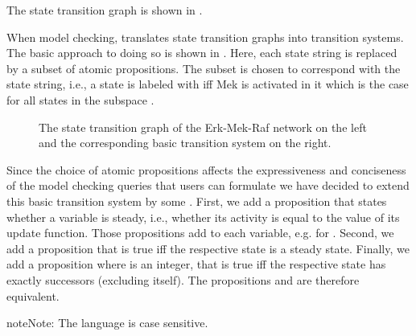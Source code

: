 \documentclass[letterpaper,10pt,english]{sphinxmanual}
\begin{document}
The state transition graph is shown in {\hyperref[\detokenize{Manual:figure17}]{}}.

When model checking,  translates state transition graphs into transition systems.
The basic approach to doing so is shown in {\hyperref[\detokenize{Manual:figure17}]{}}.
Here, each state string is replaced by a subset of atomic propositions.
The subset is chosen to correspond with the state string, i.e.,
a state is labeled with  iff Mek is activated in it which is the case for all states in the subspace .

\begin{figure}[htbp]
\centering
\capstart

\noindent{}
\caption{The state transition graph  of the Erk-Mek-Raf network on the left
and the corresponding basic transition system on the right.}\label{\detokenize{Manual:figure17}}\label{\detokenize{Manual:id21}}\end{figure}

Since the choice of atomic propositions affects the expressiveness and conciseness of the model checking queries that users can formulate
we have decided to extend this basic transition system by some .
First, we add a proposition that states whether a variable is steady, i.e., whether its activity is equal to the value of its update function.
Those propositions add  to each variable, e.g.  for .
Second, we add a proposition  that is true iff the respective state is a steady state.
Finally, we add a proposition  where  is an integer,
that is true iff the respective state has exactly  successors (excluding itself).
The propositions  and  are therefore equivalent.

\begin{sphinxadmonition}{note}{Note:}
The {\hyperref[\detokenize{Installation:installation-nusmv}]{}} language is case sensitive.
\end{sphinxadmonition}
\end{document}
